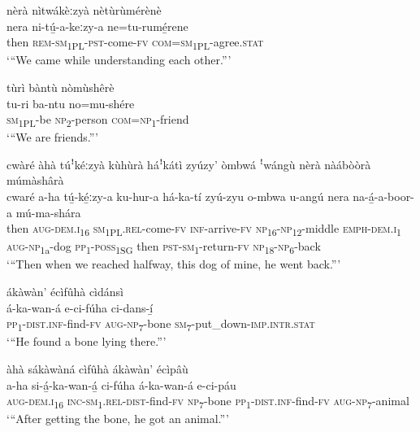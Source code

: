 nèrà nìtwákèːzyà nètùrùmérènè \\
\gll nera  ni-tú̲-a-keːzy-a    ne=tu-rumé̲rene\\
then  \textsc{rem}{}-\textsc{sm}\textsubscript{1PL}{}-\textsc{pst}{}-come-\textsc{fv}  \textsc{com}=\textsc{sm}\textsubscript{1PL}{}-agree.\textsc{stat}\\
\glt ‘“We came while understanding each other.”’\bigskip

\newpage
tùrì bàntù nòmùshêrè\\
\gll tu-ri    ba-ntu  no=mu-shére\\
\textsc{sm}\textsubscript{1PL}{}-be  \textsc{np}\textsubscript{2}{}-person  \textsc{com}=\textsc{np}\textsubscript{1}{}-friend\\
\glt ‘“We are friends.”’\bigskip

cwàré àhà túꜝkéːzyà kùhùrà háꜝkátì zyúzy’ òmbwá ꜝwángù nèrà nàábòòrà múmàshârà\\
\gll cwaré  a-ha    tú̲-ké̲ːzy-a    ku-hur-a    há-ka-tí zyú-zyu  o-mbwa    u-angú nera  na-á̲-a-boor-a  mú-ma-shára \\
then  \textsc{aug}{}-\textsc{dem}.\textsc{i}\textsubscript{16}  \textsc{sm}\textsubscript{1PL}.\textsc{rel}{}-come-\textsc{fv}  \textsc{inf}{}-arrive-\textsc{fv}  \textsc{np}\textsubscript{16}{}-\textsc{np}\textsubscript{12}{}-middle
\textsc{emph}{}-\textsc{dem}.\textsc{i}\textsubscript{1}  \textsc{aug}{}-\textsc{np}\textsubscript{1a}{}-dog  \textsc{pp}\textsubscript{1}{}-\textsc{poss}\textsubscript{1SG}
then  \textsc{pst}{}-\textsc{sm}\textsubscript{1}{}-return-\textsc{fv}  \textsc{np}\textsubscript{18}{}-\textsc{np}\textsubscript{6}{}-back\\
\glt ‘“Then when we reached halfway, this dog of mine, he went back.”’\bigskip

ákàwàn’ écìfûhà cìdánsì\\
\gll á-ka-wan-á      e-ci-fúha    ci-dans-í̲\\
\textsc{pp}\textsubscript{1}{}-\textsc{dist}.\textsc{inf}{}-find-\textsc{fv}  \textsc{aug}{}-\textsc{np}\textsubscript{7}{}-bone  \textsc{sm}\textsubscript{7}{}-put\_down-\textsc{imp}.\textsc{intr}.\textsc{stat}\\
\glt ‘“He found a bone lying there.”’\bigskip

àhà sákàwàná cìfûhà ákàwàn’ écìpâù\\
\gll a-ha    si-á̲-ka-wan-á̲    ci-fúha á-ka-wan-á      e-ci-páu \\
\textsc{aug}{}-\textsc{dem}.\textsc{i}\textsubscript{16}  \textsc{inc}{}-\textsc{sm}\textsubscript{1}.\textsc{rel}{}-\textsc{dist}{}-find-\textsc{fv}  \textsc{np}\textsubscript{7}{}-bone
\textsc{pp}\textsubscript{1}{}-\textsc{dist}.\textsc{inf}{}-find-\textsc{fv}  \textsc{aug}{}-\textsc{np}\textsubscript{7}{}-animal\\
\glt ‘“After getting the bone, he got an animal.”’\bigskip

